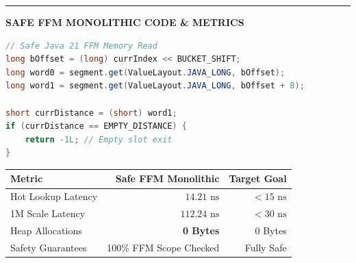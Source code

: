 \documentclass[12pt]{article}
\begin{document}
\hfill
\begin{minipage}[t]{0.01\textwidth}
    \centering\color{shidenpurple!20}\rule{0.8pt}{2.1in}
\end{minipage}%
\hfill
\begin{minipage}[t]{0.48\textwidth}
    \vspace{0pt}
    {\fontsize{9}{11}\selectfont\color{shidenmuted}\textbf{SAFE FFM MONOLITHIC CODE \& METRICS}\par}
    \vspace{1.5mm}
    
    \begin{lstlisting}[language=Java]
// Safe Java 21 FFM Memory Read
long bOffset = (long) currIndex << BUCKET_SHIFT;
long word0 = segment.get(ValueLayout.JAVA_LONG, bOffset);
long word1 = segment.get(ValueLayout.JAVA_LONG, bOffset + 8);

short currDistance = (short) word1;
if (currDistance == EMPTY_DISTANCE) {
    return -1L; // Empty slot exit
}
    \end{lstlisting}
    
    \vspace{1.5mm}
    \begin{center}
    \fontsize{8}{10}\selectfont
    \color{shidentext}
    \begin{tabular}{lrr}
    \toprule
    \textbf{Metric} & \textbf{Safe FFM Monolithic} & \textbf{Target Goal} \\
    \midrule
    Hot Lookup Latency & $14.21\text{ ns}$ & $< 15\text{ ns}$ \\
    1M Scale Latency & $112.24\text{ ns}$ & $< 30\text{ ns}$ \\
    Heap Allocations & \textbf{0 Bytes} & 0 Bytes \\
    Safety Guarantees & 100\% FFM Scope Checked & Fully Safe \\
    \bottomrule
    \end{tabular}
    \end{center}
\end{minipage}
\clearpage
\end{document}
